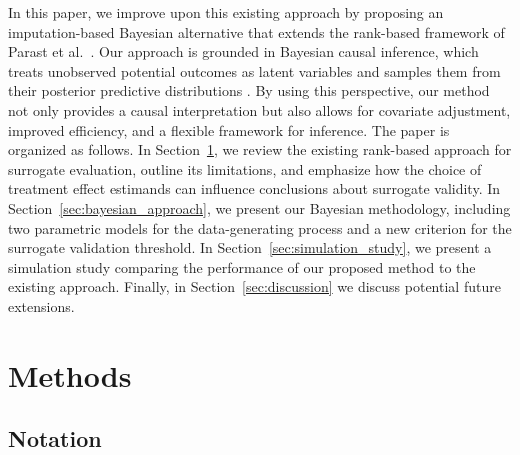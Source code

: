 \documentclass[12pt]{article}
\begin{document}
In this paper, we improve upon this existing approach by proposing an imputation-based Bayesian alternative that extends the rank-based framework of Parast et al.\ \citep{parast2024rank}. Our approach is grounded in Bayesian causal inference, which treats unobserved potential outcomes as latent variables and samples them from their posterior predictive distributions \citep{li2023bayesian}. By using this perspective, our method not only provides a causal interpretation but also allows for covariate adjustment, improved efficiency, and a flexible framework for inference. The paper is organized as follows. In Section~\ref{sec:methods}, we review the existing rank-based approach for surrogate evaluation, outline its limitations, and emphasize how the choice of treatment effect estimands can influence conclusions about surrogate validity. In Section~\ref{sec:bayesian_approach}, we present our Bayesian methodology, including two parametric models for the data-generating process and a new criterion for the surrogate validation threshold. In Section~\ref{sec:simulation_study}, we present a simulation study comparing the performance of our proposed method to the existing approach. Finally, in Section~\ref{sec:discussion} we discuss potential future extensions.

\section{Methods}\label{sec:methods}

\subsection{Notation}\label{subsec:notation}
\end{document}
